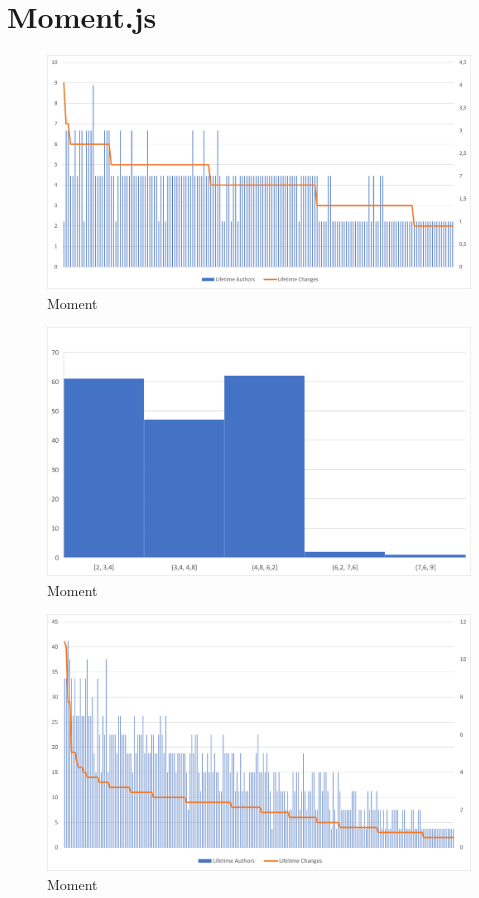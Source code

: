 \section{Moment.js}

\begin{figure}[H]
    \centering
    \includegraphics[width=1\textwidth]{images/moment/moment-2.10.5-changes.png}
    \caption{Moment}
    \label{fig:moment-2.10.5-changes}
\end{figure}

\begin{figure}[H]
    \centering
    \includegraphics[width=1\textwidth]{images/moment/moment-2.10.5-hist.png}
    \caption{Moment}
    \label{fig:moment-2.10.5-changes}
\end{figure}

\begin{figure}[H]
    \centering
    \includegraphics[width=1\textwidth]{images/moment/moment-2.20.5-changes.png}
    \caption{Moment}
    \label{fig:moment-2.10.5-changes}
\end{figure}

